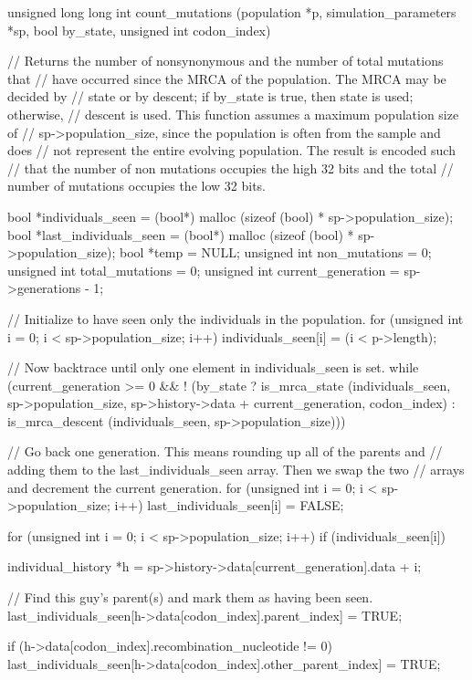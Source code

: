 \documentclass{article}
\begin{document}
\begin{ccode}
unsigned long long int count_mutations (population *p, simulation_parameters *sp, bool by_state,
					unsigned int codon_index) {
  // Returns the number of nonsynonymous and the number of total mutations that
  // have occurred since the MRCA of the population. The MRCA may be decided by
  // state or by descent; if by_state is true, then state is used; otherwise,
  // descent is used. This function assumes a maximum population size of
  // sp->population_size, since the population is often from the sample and does
  // not represent the entire evolving population. The result is encoded such
  // that the number of non mutations occupies the high 32 bits and the total
  // number of mutations occupies the low 32 bits.

  bool        *individuals_seen 	= (bool*) malloc (sizeof (bool) * sp->population_size);
  bool        *last_individuals_seen	= (bool*) malloc (sizeof (bool) * sp->population_size);
  bool        *temp			= NULL;
  unsigned int non_mutations		= 0;
  unsigned int total_mutations		= 0;
  unsigned int current_generation	= sp->generations - 1;

  // Initialize to have seen only the individuals in the population.
  for (unsigned int i = 0; i < sp->population_size; i++)
    individuals_seen[i] = (i < p->length);

  // Now backtrace until only one element in individuals_seen is set.
  while (current_generation >= 0 &&
        ! (by_state ?
            is_mrca_state (individuals_seen, sp->population_size,
			   sp->history->data + current_generation, codon_index) :
            is_mrca_descent (individuals_seen, sp->population_size))) {

    // Go back one generation. This means rounding up all of the parents and
    // adding them to the last_individuals_seen array. Then we swap the two
    // arrays and decrement the current generation.
    for (unsigned int i = 0; i < sp->population_size; i++)
      last_individuals_seen[i] = FALSE;

    for (unsigned int i = 0; i < sp->population_size; i++)
      if (individuals_seen[i]) {
        individual_history *h = sp->history->data[current_generation].data + i;

        // Find this guy's parent(s) and mark them as having been seen.
        last_individuals_seen[h->data[codon_index].parent_index] = TRUE;

        if (h->data[codon_index].recombination_nucleotide != 0)
          last_individuals_seen[h->data[codon_index].other_parent_index] = TRUE;

}}}
\end{ccode}
\end{document}

